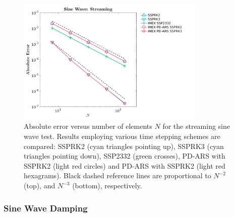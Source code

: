 \begin{figure}[h]
  \centering
    \includegraphics[width=0.8\textwidth]{figures/SineWaveStreaming}
   \caption{Absolute error versus number of elements $N$ for the streaming sine wave test.  Results employing various time stepping schemes are compared: SSPRK2 (cyan triangles pointing up), SSPRK3 (cyan triangles pointing down), SSP2332 (green crosses), PD-ARS with SSPRK2 (light red circles) and PD-ARS with SSPRK2 (light red hexagrams). Black dashed reference lines are proportional to $N^{-2}$ (top), and $N^{-3}$ (bottom), respectively.}
   \label{fig: SineWaveStreaming}
\end{figure}

\subsubsection{Sine Wave Damping}

